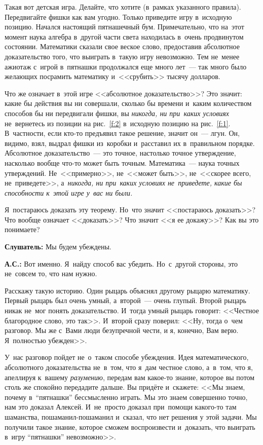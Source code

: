 Такая вот детская игра. Делайте, что хотите (в~рамках указанного правила). Передвигайте фишки как
вам угодно. Только приведите игру в~исходную позицию. Начался настоящий пятнашечный бум. Примечательно, что
на~этот момент наука алгебра в~другой части света находилась в~очень продвинутом состоянии.
Математики сказали свое веское слово, предоставив абсолютное доказательство того, что выиграть
в~такую игру невозможно. Тем не~менее ажиотаж с~игрой в~пятнашки продолжался еще много лет~--- так
много было желающих посрамить математику и~<<срубить>> тысячу долларов.


Что же означает в~этой игре <<абсолютное доказательство>>? Это значит: какие бы действия вы ни совершали,
сколько бы времени и~каким количеством способов бы
ни передвигали фишки, вы \textit{никогда, ни при~каких условиях} не~вернетесь из позиции на рис.~\ref{f:2} в~исходную позицию на рис.~\ref{f:1}.
В~частности, если кто-то предъявил такое решение, значит он~--- лгун. Он, видимо, взял, выдрал фишки
из~коробки и~расставил их в~правильном порядке. Абсолютное доказательство~--- это точное, настолько
точное утверждение, насколько вообще что-то может быть точным. Математика~--- наука точных
утверждений. Не~<<примерно>>, не~<<может быть>>, не~<<скорее всего, не~приведете>>, а~\textit{никогда, ни
при~каких условиях не~приведете, какие бы способности к~этой игре у~вас ни были.}

Я~постараюсь доказать эту теорему. Но~что значит <<постараюсь доказать>>? Что вообще означает
<<доказать>>? Что значит <<я ее докажу>>? Как вы это понимаете?

\pagebreak

\textbf{Слушатель:} Мы будем убеждены.

\textbf{А.С.:} Вот именно. Я~найду способ вас убедить. Но~с~другой стороны, это не~совсем то, что нам нужно.

Расскажу такую историю. Один рыцарь объяснял другому рыцарю математику. Первый рыцарь был очень умный,
а~второй~--- очень глупый. Второй рыцарь никак не~мог понять доказательство. И~тогда умный рыцарь
говорит: <<Честное благородное слово, это так>>. И~второй сразу поверил: <<Ну, тогда о~чем разговор.
Мы же с~Вами люди безупречной чести, и я, конечно, Вам верю. Я~полностью убежден>>.

У~нас разговор пойдет не~о~таком способе убеждения. Идея математического, абсолютного
доказательства не~в~том, что я~дам честное слово, а~в~том, что я, апеллируя к~вашему \textit{разумению},
передам вам какое-то знание, которое вы потом столь же спокойно передадите дальше. Вы придёте
и~скажете: <<Мы знаем, почему в~``пятнашки'' бессмысленно играть. Мы это знаем совершенно точно, нам это
доказал Алексей. И~не~просто доказал при~помощи какого-то там шаманства, пошаманил-пошаманил
и~сказал, что нет решения у этой задачи. Мы получили такое знание, которое сможем воспроизвести
и~доказать, что выиграть в~игру ``пятнашки'' невозможно>>.

